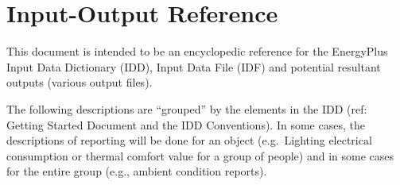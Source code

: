 \chapter{Input-Output Reference}\label{input-output-reference}

This document is intended to be an encyclopedic reference for the EnergyPlus Input Data Dictionary (IDD), Input Data File (IDF) and potential resultant outputs (various output files).

The following descriptions are ``grouped'' by the elements in the IDD (ref: Getting Started Document and the IDD Conventions). In some cases, the descriptions of reporting will be done for an object (e.g.~Lighting electrical consumption or thermal comfort value for a group of people) and in some cases for the entire group (e.g., ambient condition reports).
